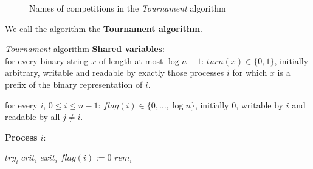 \documentclass[11pt]{article}
\begin{document}
\begin{figure}[H]
\label{fig:10.9}
\begin{center}\end{center}
\caption{Names of competitions in the \textit{Tournament} algorithm}
\end{figure}

We call the algorithm the \textbf{Tournament algorithm}.

\begin{Block}{\textit{Tournament} algorithm}
\noindent \textbf{Shared variables}:\\
\noindent for every binary string \(x\) of length at most \(\log n-1\):
\indent \(turn(x)\in\{0,1\}\), initially arbitrary, writable and readable by exactly those processes
\(i\) for which \(x\) is a prefix of the binary representation of \(i\).

\noindent for every \(i\), \(0\le i\le n-1\):
\indent \(flag(i)\in\{0,\dots,\log n\}\), initially 0, writable by \(i\) and readable by all \(j\neq
        i\).

\noindent \textbf{Process \(i\)}:\\
\begin{algorithm}[H]
\KwRem
\(try_i\)\;
\(crit_i\)\;
\KwCrit
\(exit_i\)\;
\(flag(i):=0\)\;
\(rem_i\)\;
\end{algorithm}
\end{Block}
\end{document}
